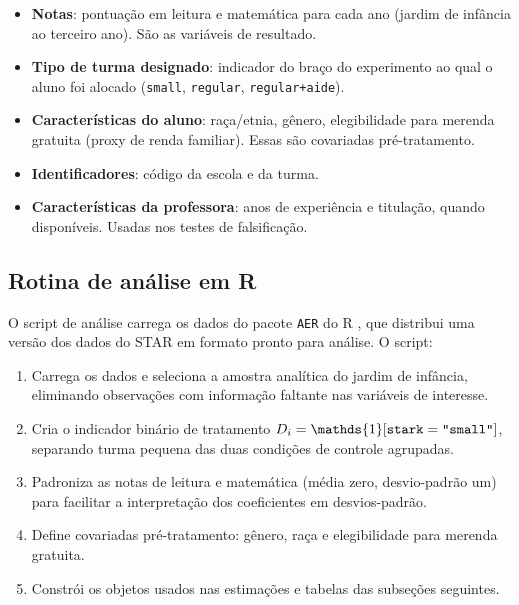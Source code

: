 \begin{itemize}[leftmargin=*]
  \item \textbf{Notas}: pontuação em leitura e matemática para cada ano (jardim de infância ao terceiro ano). São as variáveis de resultado.
  \item \textbf{Tipo de turma designado}: indicador do braço do experimento ao qual o aluno foi alocado (\texttt{small}, \texttt{regular}, \texttt{regular+aide}).
  \item \textbf{Características do aluno}: raça/etnia, gênero, elegibilidade para merenda gratuita (proxy de renda familiar). Essas são covariadas pré-tratamento.
  \item \textbf{Identificadores}: código da escola e da turma.
  \item \textbf{Características da professora}: anos de experiência e titulação, quando disponíveis. Usadas nos testes de falsificação.
\end{itemize}

\subsection*{Rotina de análise em R}

O script de análise carrega os dados do pacote \texttt{AER} do R \citep{Zeileis2008}, que distribui uma versão dos dados do STAR em formato pronto para análise. O script:

\begin{enumerate}[leftmargin=*, label=(\roman*)]
  \item Carrega os dados e seleciona a amostra analítica do jardim de infância, eliminando observações com informação faltante nas variáveis de interesse.
  \item Cria o indicador binário de tratamento $D_i = \mathds{1}[\texttt{stark} = \texttt{\textquotedbl small\textquotedbl}]$, separando turma pequena das duas condições de controle agrupadas.
  \item Padroniza as notas de leitura e matemática (média zero, desvio-padrão um) para facilitar a interpretação dos coeficientes em desvios-padrão.
  \item Define covariadas pré-tratamento: gênero, raça e elegibilidade para merenda gratuita.
  \item Constrói os objetos usados nas estimações e tabelas das subseções seguintes.
\end{enumerate}

